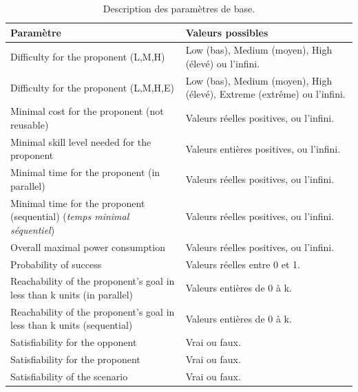 			\begin{table}[h]
				\centering
				\begin{tabular}{|p{6cm}|p{5cm}|}
					\hline
					\textbf{Paramètre} & \textbf{Valeurs possibles} \\
					\hline
					Difficulty for the proponent (L,M,H) & 
						Low (bas), Medium (moyen), High (élevé) ou l'infini.\\ 
					\hline
					Difficulty for the proponent (L,M,H,E) & 
						Low (bas), Medium (moyen), High (élevé), Extreme (extrême) ou l'infini.\\ 
					\hline
					Minimal cost for the proponent (not reusable) & 
						Valeurs réelles positives, ou l'infini.\\ 
					\hline
					Minimal skill level needed for the proponent & 
						Valeurs entières positives, ou l'infini.\\ 
					\hline
					Minimal time for the proponent (in parallel) & 
						Valeurs réelles positives, ou l'infini.\\ 
					\hline
					Minimal time for the proponent (sequential) (\textit{temps minimal séquentiel}) & 
						Valeurs réelles positives, ou l'infini.\\ 
					\hline
					Overall maximal power consumption & 
						Valeurs réelles positives, ou l'infini.\\ 
					\hline
					Probability of success &
						Valeurs réelles entre 0 et 1.\\ 
					\hline
					Reachability of the proponent's goal in less than k units (in parallel) & 
						Valeurs entières de 0 à k. \\ 
					\hline
					Reachability of the proponent's goal in less than k units (sequential) & 
						Valeurs entières de 0 à k. \\ 
					\hline
					Satisfiability for the opponent & 
						Vrai ou faux. \\ 
					\hline
					Satisfiability for the proponent & 
						Vrai ou faux. \\ 
					\hline
					Satisfiability of the scenario & 
						Vrai ou faux. \\
					\hline
				\end{tabular}
				\caption{Description des paramètres de base.}
				\label{tab:DescriptionParam}
			\end{table}


